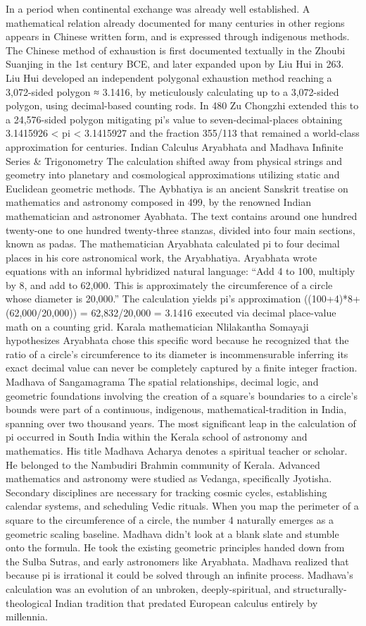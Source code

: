 {In a period when continental exchange was already well established. A mathematical relation already documented for many centuries in other regions appears in Chinese written form, and is expressed through indigenous methods. The Chinese method of exhaustion is first documented textually in the Zhoubi Suanjing in the 1st century BCE, and later expanded upon by Liu Hui in 263. Liu Hui developed an independent polygonal exhaustion method reaching a 3,072-sided polygon ≈ 3.1416, by meticulously calculating up to a 3,072-sided polygon, using decimal-based counting rods. In 480 Zu Chongzhi extended this to a 24,576-sided polygon mitigating pi’s value to seven-decimal-places obtaining 3.1415926 < pi < 3.1415927 and the fraction 355/113 that remained a world-class approximation for centuries. 
Indian Calculus Aryabhata and Madhava
Infinite Series & Trigonometry
The calculation shifted away from physical strings and geometry into planetary and cosmological approximations utilizing static and Euclidean geometric methods. The Aybhatiya is an ancient Sanskrit treatise on mathematics and astronomy composed in 499, by the renowned Indian mathematician and astronomer Ayabhata. The text contains around one hundred twenty-one to one hundred twenty-three stanzas, divided into four main sections, known as padas. The mathematician Aryabhata calculated pi to four decimal places in his core astronomical work, the Aryabhatiya. Aryabhata wrote equations with an informal hybridized natural language: 
“Add 4 to 100, multiply by 8, and add to 62,000. This is approximately the circumference of a circle whose diameter is 20,000.”
The calculation yields pi’s approximation
((100+4)*8+({62,000}/{20,000})) = {62,832}/{20,000} = 3.1416
executed via decimal place-value math on a counting grid.
Karala mathematician Nlilakantha Somayaji hypothesizes Aryabhata chose this specific word because he recognized that the ratio of a circle’s circumference to its diameter is incommensurable inferring its exact decimal value can never be completely captured by a finite integer fraction. 
Madhava of Sangamagrama
The spatial relationships, decimal logic, and geometric foundations involving the creation of a square’s boundaries to a circle’s bounds were part of a continuous, indigenous, mathematical-tradition in India, spanning over two thousand years. The most significant leap in the calculation of pi occurred in South India within the Kerala school of astronomy and mathematics. His title Madhava Acharya denotes a spiritual teacher or scholar. He belonged to the Nambudiri Brahmin community of Kerala. Advanced mathematics and astronomy were studied as Vedanga, specifically Jyotisha. Secondary disciplines are necessary for tracking cosmic cycles, establishing calendar systems, and scheduling Vedic rituals. When you map the perimeter of a square to the circumference of a circle, the number 4 naturally emerges as a geometric scaling baseline. Madhava didn’t look at a blank slate and stumble onto the formula. He took the existing geometric principles handed down from the Sulba Sutras, and early astronomers like Aryabhata. Madhava realized that because pi is irrational it could be solved through an infinite process. Madhava’s calculation was an evolution of an unbroken, deeply-spiritual, and structurally-theological Indian tradition that predated European calculus entirely by millennia.
}
